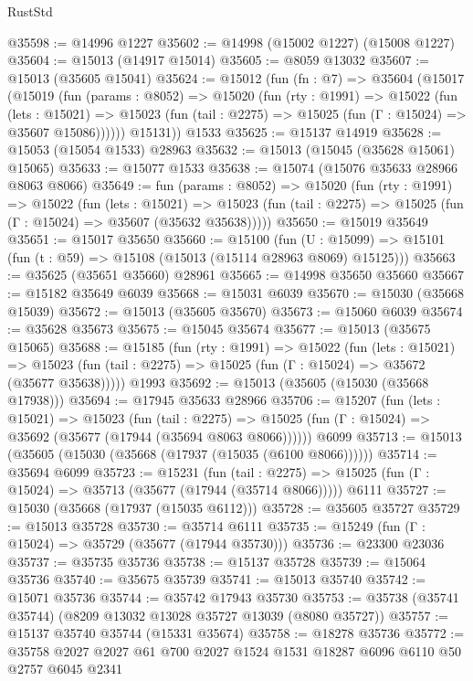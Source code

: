 \begin{lexlean}{RustStd}
\begin{coremodule}
@35598 := @14996 @1227
@35602 := @14998 (@15002 @1227) (@15008 @1227)
@35604 := @15013 (@14917 @15014)
@35605 := @8059 @13032
@35607 := @15013 (@35605 @15041)
@35624 := @15012
    (fun (fn : @7) =>
    @35604
      (@15017
        (@15019
          (fun (params : @8052) =>
          @15020
            (fun (rty : @1991) =>
            @15022
              (fun (lets : @15021) =>
              @15023 (fun (tail : @2275) => @15025 (fun (Γ : @15024) => @35607 @15086))))))
        @15131))
    @1533
@35625 := @15137 @14919
@35628 := @15053 (@15054 @1533) @28963
@35632 := @15013 (@15045 (@35628 @15061) @15065)
@35633 := @15077 @1533
@35638 := @15074 (@15076 @35633 @28966 @8063 @8066)
@35649 := fun (params : @8052) =>
  @15020
    (fun (rty : @1991) =>
    @15022
      (fun (lets : @15021) =>
      @15023 (fun (tail : @2275) => @15025 (fun (Γ : @15024) => @35607 (@35632 @35638)))))
@35650 := @15019 @35649
@35651 := @15017 @35650
@35660 := @15100
    (fun (U : @15099) => @15101 (fun (t : @59) => @15108 (@15013 (@15114 @28963 @8069) @15125)))
@35663 := @35625 (@35651 @35660) @28961
@35665 := @14998 @35650 @35660
@35667 := @15182 @35649 @6039
@35668 := @15031 @6039
@35670 := @15030 (@35668 @15039)
@35672 := @15013 (@35605 @35670)
@35673 := @15060 @6039
@35674 := @35628 @35673
@35675 := @15045 @35674
@35677 := @15013 (@35675 @15065)
@35688 := @15185
    (fun (rty : @1991) =>
    @15022
      (fun (lets : @15021) =>
      @15023 (fun (tail : @2275) => @15025 (fun (Γ : @15024) => @35672 (@35677 @35638)))))
    @1993
@35692 := @15013 (@35605 (@15030 (@35668 @17938)))
@35694 := @17945 @35633 @28966
@35706 := @15207
    (fun (lets : @15021) =>
    @15023
      (fun (tail : @2275) =>
      @15025 (fun (Γ : @15024) => @35692 (@35677 (@17944 (@35694 @8063 @8066))))))
    @6099
@35713 := @15013 (@35605 (@15030 (@35668 (@17937 (@15035 (@6100 @8066))))))
@35714 := @35694 @6099
@35723 := @15231
    (fun (tail : @2275) => @15025 (fun (Γ : @15024) => @35713 (@35677 (@17944 (@35714 @8066)))))
    @6111
@35727 := @15030 (@35668 (@17937 (@15035 @6112)))
@35728 := @35605 @35727
@35729 := @15013 @35728
@35730 := @35714 @6111
@35735 := @15249 (fun (Γ : @15024) => @35729 (@35677 (@17944 @35730)))
@35736 := @23300 @23036
@35737 := @35735 @35736
@35738 := @15137 @35728
@35739 := @15064 @35736
@35740 := @35675 @35739
@35741 := @15013 @35740
@35742 := @15071 @35736
@35744 := @35742 @17943 @35730
@35753 := @35738 (@35741 @35744) (@8209 @13032 @13028 @35727 @13039 (@8080 @35727))
@35757 := @15137 @35740 @35744 (@15331 @35674)
@35758 := @18278 @35736
@35772 := @35758 @2027 @2027 @61 @700 @2027 @1524 @1531 @18287 @6096 @6110 @50 @2757 @6045 @2341

\end{coremodule}
\end{lexlean}
